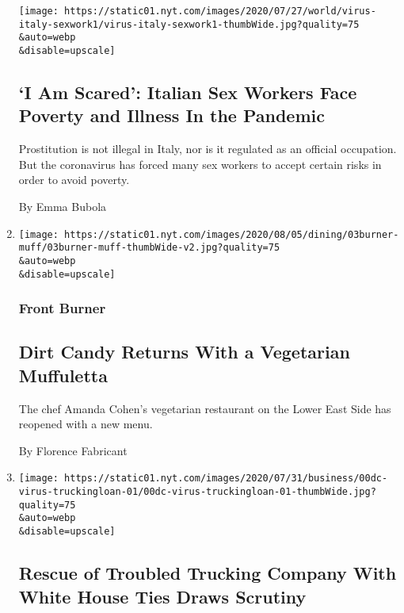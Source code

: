 \begin{enumerate}
  \texttt{[image: https://static01.nyt.com/images/2020/07/27/world/virus-italy-sexwork1/virus-italy-sexwork1-thumbWide.jpg?quality=75\\\&auto=webp\\\&disable=upscale]}

  \hypertarget{i-am-scared-italian-sex-workers-face-poverty-and-illness-in-the-pandemic}{%
  \subsection{`I Am Scared': Italian Sex Workers Face Poverty and
  Illness In the
  Pandemic}\label{i-am-scared-italian-sex-workers-face-poverty-and-illness-in-the-pandemic}}

  Prostitution is not illegal in Italy, nor is it regulated as an
  official occupation. But the coronavirus has forced many sex workers
  to accept certain risks in order to avoid poverty.

  By Emma Bubola
\item
  \href{/2020/08/03/dining/dirt-candy-vegetarian-muffuletta.html}{}

  \texttt{[image: https://static01.nyt.com/images/2020/08/05/dining/03burner-muff/03burner-muff-thumbWide-v2.jpg?quality=75\\\&auto=webp\\\&disable=upscale]}

  \hypertarget{front-burner}{%
  \subsubsection{Front Burner}\label{front-burner}}

  \hypertarget{dirt-candy-returns-with-a-vegetarian-muffuletta}{%
  \subsection{Dirt Candy Returns With a Vegetarian
  Muffuletta}\label{dirt-candy-returns-with-a-vegetarian-muffuletta}}

  The chef Amanda Cohen's vegetarian restaurant on the Lower East Side
  has reopened with a new menu.

  By Florence Fabricant
\item
  \href{/2020/08/03/us/politics/yrc-coronavirus-relief-funds.html}{}

  \texttt{[image: https://static01.nyt.com/images/2020/07/31/business/00dc-virus-truckingloan-01/00dc-virus-truckingloan-01-thumbWide.jpg?quality=75\\\&auto=webp\\\&disable=upscale]}

  \hypertarget{rescue-of-troubled-trucking-company-with-white-house-ties-draws-scrutiny}{%
  \subsection{Rescue of Troubled Trucking Company With White House Ties
  Draws
  Scrutiny}\label{rescue-of-troubled-trucking-company-with-white-house-ties-draws-scrutiny}}


\end{enumerate}
